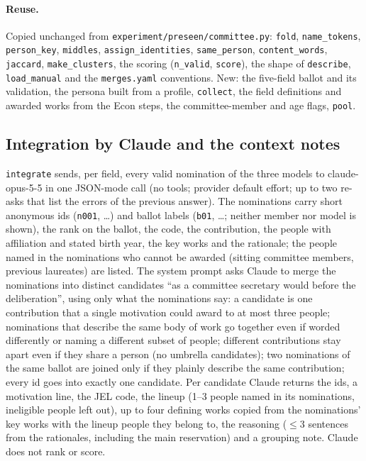 \documentclass[11pt,a4paper]{article}
\newcommand{\code}[1]{\texttt{#1}}
\begin{document}
\paragraph{Reuse.} Copied unchanged from \code{experiment/preseen/committee.py}: \code{fold}, \code{name\_tokens},
\code{person\_key}, \code{middles}, \code{assign\_identities}, \code{same\_person}, \code{content\_words},
\code{jaccard}, \code{make\_clusters}, the scoring (\code{n\_valid}, \code{score}), the shape of \code{describe},
\code{load\_manual} and the \code{merges.yaml} conventions. New: the five-field ballot and its validation, the persona
built from a profile, \code{collect}, the field definitions and awarded works from the Econ steps, the committee-member
and age flags, \code{pool}.

\subsection{Integration by Claude and the context notes}

\code{integrate} sends, per field, every valid nomination of the three models to claude-opus-5-5 in one JSON-mode call
(no tools; provider default effort; up to two re-asks that list the errors of the previous answer). The nominations
carry short anonymous ids (\code{n001}, \ldots) and ballot labels (\code{b01}, \ldots; neither member nor model is
shown), the rank on the ballot, the code, the contribution, the people with affiliation and stated birth year, the key
works and the rationale; the people named in the nominations who cannot be awarded (sitting committee members,
previous laureates) are listed. The system prompt asks Claude to merge the nominations into distinct candidates ``as a
committee secretary would before the deliberation'', using only what the nominations say: a candidate is one
contribution that a single motivation could award to at most three people; nominations that describe the same body of
work go together even if worded differently or naming a different subset of people; different contributions stay
apart even if they share a person (no umbrella candidates); two nominations of the same ballot are joined only if they
plainly describe the same contribution; every id goes into exactly one candidate. Per candidate Claude returns the ids,
a motivation line, the JEL code, the lineup (1--3 people named in its nominations, ineligible people left out), up to
four defining works copied from the nominations' key works with the lineup people they belong to, the reasoning
($\leq 3$ sentences from the rationales, including the main reservation) and a grouping note. Claude does not rank or
score.
\end{document}
